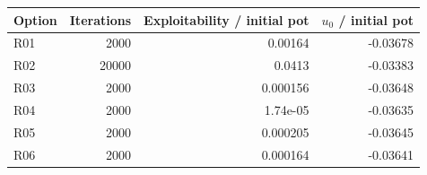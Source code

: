 \begin{tabular}{lrrr}
\toprule
Option & Iterations & Exploitability / initial pot & $u_0$ / initial pot \\
\midrule
R01 & 2000 & 0.00164 & -0.03678 \\
R02 & 20000 & 0.0413 & -0.03383 \\
R03 & 2000 & 0.000156 & -0.03648 \\
R04 & 2000 & 1.74e-05 & -0.03635 \\
R05 & 2000 & 0.000205 & -0.03645 \\
R06 & 2000 & 0.000164 & -0.03641 \\
\bottomrule
\end{tabular}
